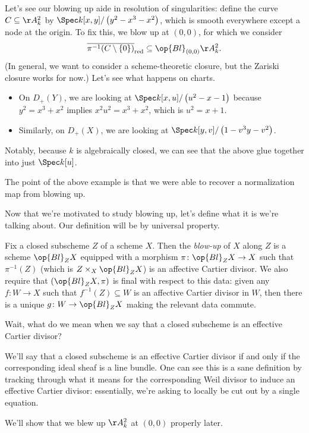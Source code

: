 \documentclass[../notes.tex]{subfiles}
\begin{document}
\begin{example}
	Let's see our blowing up aide in resolution of singularities: define the curve $C\subseteq\AA^2_k$ by $\Spec k[x,y]/\left(y^2-x^3-x^2\right)$, which is smooth everywhere except a node at the origin. To fix this, we blow up at $(0,0)$, for which we consider
	\[\overline{\pi^{-1}(C\setminus\{0\})}_{\mathrm{red}}\subseteq\op{Bl}_{(0,0)}\AA^2_k.\]
	(In general, we want to consider a scheme-theoretic closure, but the Zariski closure works for now.) Let's see what happens on charts.
	\begin{itemize}
		\item On $D_+(Y)$, we are looking at $\Spec k[x,u]/\left(u^2-x-1\right)$ because $y^2=x^3+x^2$ implies $x^2u^2=x^3+x^2$, which is $u^2=x+1$.
		\item Similarly, on $D_+(X)$, we are looking at $\Spec k[y,v]/\left(1-v^3y-v^2\right)$.
	\end{itemize}
	Notably, because $k$ is algebraically closed, we can see that the above glue together into just $\Spec k[u]$.
\end{example}
The point of the above example is that we were able to recover a normalization map from blowing up.

Now that we're motivated to study blowing up, let's define what it is we're talking about. Our definition will be by universal property.
\begin{definition}[Blowing up]
	Fix a closed subscheme $Z$ of a scheme $X$. Then the \textit{blow-up} of $X$ along $Z$ is a scheme $\op{Bl}_ZX$ equipped with a morphism $\pi\colon\op{Bl}_ZX\to X$ such that $\pi^{-1}(Z)$ (which is $Z\times_X\op{Bl}_ZX$) is an affective Cartier divisor. We also require that $(\op{Bl}_ZX,\pi)$ is final with respect to this data: given any $f\colon W\to X$ such that $f^{-1}(Z)\subseteq W$ is an affective Cartier divisor in $W$, then there is a unique $g\colon W\to\op{Bl}_ZX$ making the relevant data commute.
\end{definition}
Wait, what do we mean when we say that a closed subscheme is an effective Cartier divisor?
\begin{remark}
	We'll say that a closed subscheme is an effective Cartier divisor if and only if the corresponding ideal sheaf is a line bundle. One can see this is a sane definition by tracking through what it means for the corresponding Weil divisor to induce an effective Cartier divisor: essentially, we're asking to locally be cut out by a single equation.
\end{remark}
We'll show that we blew up $\AA^2_k$ at $(0,0)$ properly later.
\end{document}
